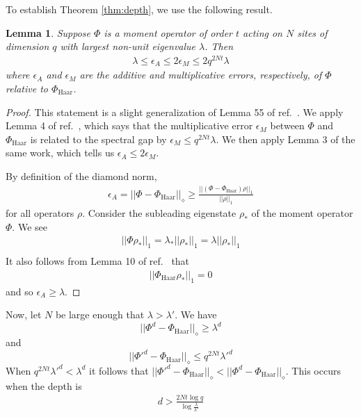 \documentclass[aps,prx,floatfix,nofootinbib,superscriptaddress,longbibliography]{revtex4-2}
\newtheorem{lemma}{Lemma}
\begin{document}
To establish Theorem \ref{thm:depth}, we use the following result.
\begin{lemma}
    \label{lemma:depth_from_gap}
    Suppose \(\Phi\) is a moment operator of order $t$ acting on $N$ sites of dimension $q$ with largest non-unit eigenvalue $\lambda$. Then
    \begin{gather}
        \lambda \leq \epsilon_A \leq 2\epsilon_M \leq 2 q^{2Nt}\lambda
    \end{gather}
    where $\epsilon_A$ and $\epsilon_M$ are the additive and multiplicative errors, respectively, of \(\Phi\) relative to \(\Phi_\text{Haar}\).
\end{lemma}
\begin{proof}
    This statement is a slight generalization of Lemma 55 of ref.~. We apply Lemma 4 of ref.~, which says that the multiplicative error $\epsilon_M$ between $\Phi$ and $\Phi_\text{Haar}$ is related to the spectral gap by $ \epsilon_M \leq q^{2Nt} \lambda$. We then apply Lemma 3 of the same work, which tells us \(\epsilon_A \leq 2 \epsilon_M\).

    By definition of the diamond norm,
    \begin{gather}
        \epsilon_A = ||\Phi - \Phi_\text{Haar}||_\diamond \geq \frac{||(\Phi - \Phi_\text{Haar})\rho||_1}{||\rho||_1}
    \end{gather}
    for all operators $\rho$. Consider the subleading eigenstate $\rho_*$ of the moment operator $\Phi$. We see
    \begin{gather}
        ||\Phi\rho_*||_1 = \lambda_* ||\rho_*||_1 = \lambda ||\rho_*||_1\\
    \end{gather}
    It also follows from Lemma 10 of ref.~ that
    \begin{gather}
        ||\Phi_\text{Haar} \rho_*||_1 = 0
    \end{gather}
    and so \(\epsilon_A \geq \lambda\).
\end{proof}
Now, let $N$ be large enough that $\lambda > \lambda'$. We have
\[||\Phi^d - \Phi_{\text{Haar}}||_\diamond \geq \lambda^d\]
and 
\[||\Phi'^d - \Phi_{\text{Haar}}||_\diamond \leq q^{2Nt}{\lambda'}^d\]
When
$q^{2Nt}{\lambda'}^d < \lambda^d$
it follows that 
$||\Phi'^d - \Phi_{\text{Haar}}||_\diamond < ||\Phi^d - \Phi_{\text{Haar}}||_\diamond$. This occurs when the depth is
\begin{gather}
    d > \frac{2Nt \log q}{\log \frac{\lambda}{\lambda'}}
\end{gather}
\end{document}
